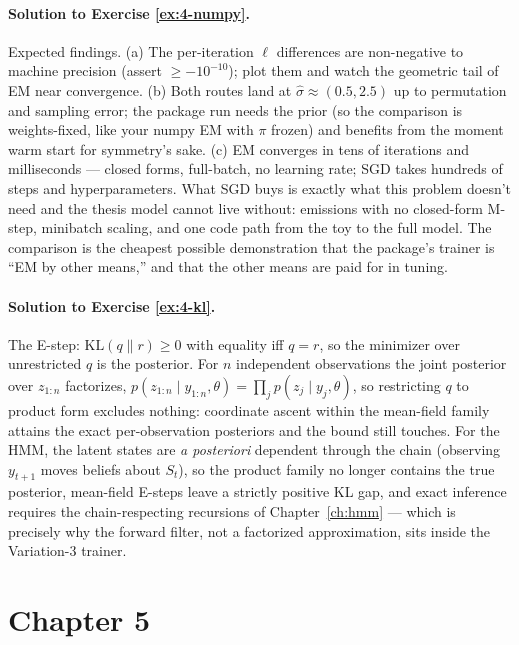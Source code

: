 \paragraph{Solution to Exercise \ref{ex:4-numpy}.}
Expected findings. (a) The per-iteration $\ell$ differences are
non-negative to machine precision (assert $\ge -10^{-10}$); plot them
and watch the geometric tail of EM near convergence. (b) Both routes
land at $\hat\sigma \approx (0.5, 2.5)$ up to permutation and sampling
error; the package run needs the  prior (so the comparison
is weights-fixed, like your numpy EM with $\pi$ frozen) and benefits
from the moment warm start for symmetry's sake. (c) EM converges in tens
of iterations and milliseconds --- closed forms, full-batch, no learning
rate; SGD takes hundreds of steps and hyperparameters. What SGD buys is
exactly what this problem doesn't need and the thesis model cannot live
without: emissions with no closed-form M-step, minibatch scaling, and
one code path from the toy to the full model. The comparison is the
cheapest possible demonstration that the package's trainer is ``EM by
other means,'' and that the other means are paid for in tuning.

\paragraph{Solution to Exercise \ref{ex:4-kl}.}
The E-step: $\mathrm{KL}(q \| r) \ge 0$ with equality iff $q = r$, so
the minimizer over unrestricted $q$ is the posterior. For $n$
independent observations the joint posterior over $z_{1:n}$ factorizes,
$p(z_{1:n} \mid y_{1:n}, \theta) = \prod_j p(z_j \mid y_j, \theta)$, so
restricting $q$ to product form excludes nothing: coordinate ascent
within the mean-field family attains the exact per-observation
posteriors and the bound still touches. For the HMM, the latent states
are \emph{a posteriori} dependent through the chain (observing
$y_{t+1}$ moves beliefs about $S_t$), so the product family no longer
contains the true posterior, mean-field E-steps leave a strictly
positive KL gap, and exact inference requires the chain-respecting
recursions of Chapter~\ref{ch:hmm} --- which is precisely why the
forward filter, not a factorized approximation, sits inside the
Variation-3 trainer.

\section*{Chapter 5}

